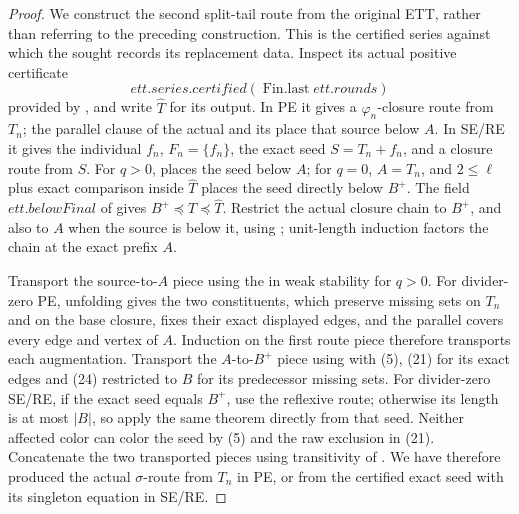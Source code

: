 \begin{proof}
We construct the second split-tail route from the original ETT, rather
than referring to the preceding construction.  This is the certified
series against which the sought
 records its replacement data.
Inspect its actual positive certificate
\[
 \mathit{ett.series.certified}(\operatorname{Fin.last}\mathit{ett.rounds})
\]
provided by , and write \(\widehat T\) for its
output.  In PE it gives a \(\varphi_n\)-closure route from \(T_n\); the
parallel clause of the actual  and its
 place that source below \(A\).  In SE/RE it
gives the individual \(f_n\), \(F_n=\{f_n\}\), the exact seed
\(S=T_n+f_n\), and a closure route from \(S\).  For \(q>0\),
 places the seed below \(A\); for
\(q=0\), \(A=T_n\), and \(2\le\ell\) plus exact comparison inside
\(\widehat T\) places the seed directly below \(B^+\).  The field
\(\mathit{ett.belowFinal}\) of  gives
\(B^+\preccurlyeq T\preccurlyeq\widehat T\).  Restrict the actual closure
chain to \(B^+\), and also to \(A\) when the source is below it, using
; unit-length induction
factors the chain at the exact prefix \(A\).

Transport the source-to-\(A\) piece using the
 in weak stability for \(q>0\).  For
divider-zero PE, unfolding  gives the two
 constituents, which preserve missing sets on
\(T_n\) and on the base closure,
 fixes their exact displayed edges,
and the parallel  covers every edge and vertex of
\(A\).  Induction on the first route piece therefore transports each
augmentation.  Transport the \(A\)-to-\(B^+\) piece using
 with (5), (21)
for its exact edges and (24) restricted to \(B\) for its predecessor
missing sets.  For divider-zero SE/RE, if the exact seed equals \(B^+\),
use the reflexive route; otherwise its length is at most \(|B|\), so apply
the same theorem directly from that seed.  Neither affected color can
color the seed by (5) and the raw exclusion in (21).  Concatenate the two
transported pieces
using transitivity of .  We have
therefore produced the actual \(\sigma\)-route from \(T_n\) in PE, or
from the certified exact seed with its singleton equation in SE/RE.


\end{proof}
